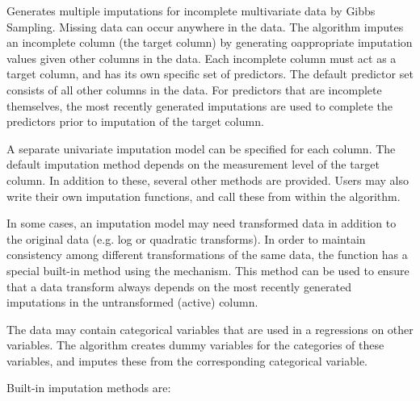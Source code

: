 \documentclass{article}
\begin{document}
\begin{Details}\relax
Generates multiple imputations for incomplete multivariate data by Gibbs
Sampling. Missing data can occur anywhere in the data. The algorithm
imputes an incomplete column (the target column) by generating
oappropriate imputation values given other columns in the data. Each
incomplete column must act as a target column, and has its own specific
set of predictors. The default predictor set consists of all other
columns in the data. For predictors that are incomplete themselves, the
most recently generated imputations are used to complete the predictors
prior to imputation of the target column. 

A separate univariate imputation model can be specified for each
column. The default imputation method depends on the measurement level
of the target column. In addition to these, several other methods are
provided. Users may also write their own imputation functions, and call
these from within the algorithm. 

In some cases, an imputation model may need transformed data in addition
to the original data (e.g. log or quadratic transforms). In order to
maintain consistency among different transformations of the same data,
the function has a special built-in method using the \code{\textasciitilde{}} mechanism. This
method can be used to ensure that a data transform always depends on the
most recently generated imputations in the untransformed (active)
column.  

The data may contain categorical variables that are used in a
regressions on other variables. The algorithm creates dummy variables
for the categories of these variables, and imputes these from the
corresponding categorical variable. 

Built-in imputation methods are:


\end{Details}
\end{document}
